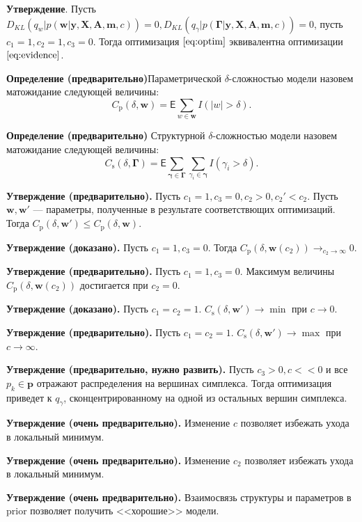 \documentclass[12pt]{article}
\begin{document}
\textbf{Утверждение}. Пусть $D_{KL}(q_w|p(\mathbf{w}|\mathbf{y}, \mathbf{X}, \mathbf{A},\mathbf{m}, c)) = 0, D_{KL}(q_\gamma|p(\boldsymbol{\Gamma}|\mathbf{y}, \mathbf{X}, \mathbf{A},\mathbf{m}, c)) = 0$, пусть $c_1 = 1, c_2 = 1, c_3 = 0$. Тогда оптимизация $\eqref{eq:optim}$ эквивалентна оптимизации $\eqref{eq:evidence}$.

\textbf{Определение (предварительно)}Параметрической $\delta$-сложностью модели назовем матожидание следующей величины:
\[
    C_\text{p}(\delta, \mathbf{w}) = \mathsf{E}\sum_{w \in \mathbf{w}} I(|w| > \delta).
\] 

\textbf{Определение (предварительно)} Структурной $\delta$-сложностью модели назовем матожидание следующей величины:
\[
     C_\text{s}(\delta, \boldsymbol{\Gamma}) = \mathsf{E}\sum_{\boldsymbol{\gamma} \in \boldsymbol{\Gamma}}\sum_{\gamma_i \in \boldsymbol{\gamma}} I(\gamma_i > \delta). 
\]


\textbf{Утверждение (предварительно).} Пусть $c_1 = 1, c_3 = 0, c_2 > 0, c_2' < c_2$. Пусть $\mathbf{w}, \mathbf{w}'$ --- параметры, полученные в результате соответствющих оптимизаций. Тогда  $C_\text{p}(\delta, \mathbf{w}') \leq C_\text{p}(\delta, \mathbf{w}).$ 

\textbf{Утверждение (доказано).} Пусть $c_1 = 1, c_3 = 0$. Тогда  $C_\text{p}(\delta, \mathbf{w}(c_2)) \to_{c_2 \to \infty} 0$. 


\textbf{Утверждение (предварительно).} Пусть $c_1 = 1, c_3 = 0$. Максимум величины $C_\text{p}(\delta, \mathbf{w}(c_2))$ достигается при $c_2= 0$. 


\textbf{Утверждение (доказано).} Пусть $c_1 = c_2 = 1$. $C_\text{s}(\delta, \mathbf{w}')  \to \min$ при $c \to 0$.


\textbf{Утверждение (предварительно).} Пусть $c_1 = c_2 = 1$. $C_\text{s}(\delta, \mathbf{w}')  \to \max$ при $c \to \infty$.

\textbf{Утверждение (предварительно, нужно развить).} Пусть $c_3 > 0, c << 0$ и все $p_k \in \mathbf{p}$ отражают распределения на вершинах симплекса. Тогда оптимизация приведет к $q_\gamma$, сконцентрированному на одной из остальных вершин симплекса.

\textbf{Утверждение (очень предварительно).} Изменение $c$ позволяет избежать ухода в локальный минимум. 

\textbf{Утверждение (очень предварительно).} Изменение $c_2$ позволяет избежать ухода в локальный минимум.

\textbf{Утверждение (очень предварительно).} Взаимосвязь структуры и параметров в prior позволяет получить <<хорошие>> модели.
\end{document}
